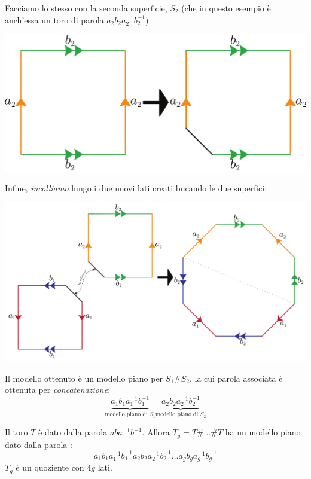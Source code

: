 \vspace{-3mm}
Facciamo lo stesso con la seconda superficie, $S_2$ (che in questo esempio è anch'essa un toro di parola $a_2b_2a_2^{-1}b_2^{-1}$).
\vspace{-3mm}
\begin{center}
	\includegraphics[trim=0cm 0cm 0cm 0cm, clip, scale=0.35]{images/torusmodelconnect3.pdf}
\end{center}
\vspace{-3mm}
Infine, \textit{incolliamo} lungo i due nuovi lati creati bucando le due superfici:
\vspace{-3mm}
 \begin{center}
 	\includegraphics[trim=0cm 0cm 0cm 0cm, clip, scale=0.35]{images/torusmodelconnect4.pdf}
 \end{center}
Il modello ottenuto è un modello piano per $S_1\# S_2$, la cui parola associata è ottenuta per \textit{concatenazione}:
\begin{equation*}
	\underbrace{a_1b_1a_1^{-1}b_1^{-1}}_{\text{modello piano di }S_1}\underbrace{a_2b_2a_2^{-1}b_2^{-1}}_{\text{modello piano di }S_2}
\end{equation*}
\begin{example}
Il toro $T$ è dato dalla parola $aba^{-1}b^{-1}$. Allora $T_g=T\#\ldots\# T$ ha un modello piano dato dalla parola :
\begin{equation*}
a_1b_1a_1^{-1}b_1^{-1}a_2b_2a_2^{-1}b_2^{-1}\ldots a_gb_ga_g^{-1}b_g^{-1}
\end{equation*}
$T_g$ è un quoziente con $4g$ lati.
\end{example}
